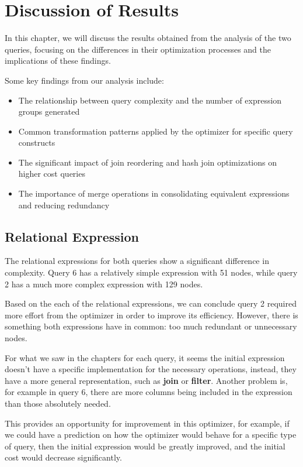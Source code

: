\documentclass[a4paper,12pt]{scrreprt}
\begin{document}
\chapter{Discussion of Results} \label{chap:discussion}
\thispagestyle{fancy}

In this chapter, we will discuss the results obtained from the analysis of the two queries, focusing on the differences in their optimization processes and the implications of these findings.

Some key findings from our analysis include:
\begin{itemize}
    \item The relationship between query complexity and the number of expression groups generated
    \item Common transformation patterns applied by the optimizer for specific query constructs
    \item The significant impact of join reordering and hash join optimizations on higher cost queries
    \item The importance of merge operations in consolidating equivalent expressions and reducing redundancy
\end{itemize}

\section{Relational Expression}
The relational expressions for both queries show a significant difference in complexity. Query 6 has a relatively simple expression with 51 nodes, while query 2 has a much more complex expression with 129 nodes.

Based on the each of the relational expressions, we can conclude query 2 required more effort from the optimizer in order to improve its efficiency. However, there is something both expressions have in common: too much redundant or unnecessary nodes.

For what we saw in the chapters for each query, it seems the initial expression doesn't have a specific implementation for the necessary operations, instead, they have a more general representation, such as \textbf{join} or \textbf{filter}. Another problem is, for example in query 6, there are more columns being included in the expression than those absolutely needed.

This provides an opportunity for improvement in this optimizer, for example, if we could have a prediction on how the optimizer would behave for a specific type of query, then the initial expression would be greatly improved, and the initial cost would decrease significantly.
\end{document}
